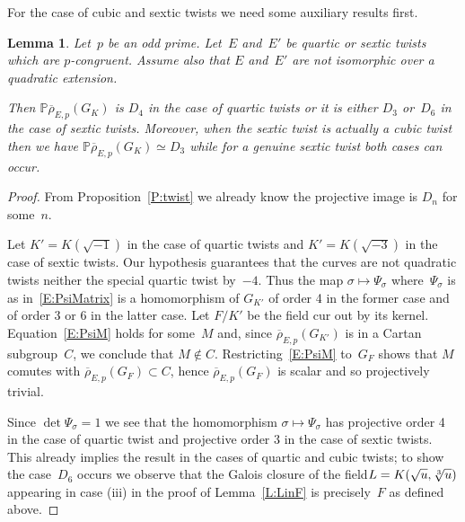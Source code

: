 \documentclass[12pt, reqno]{amsart}
\newcommand{\PP}{\mathbb{P}}
\newcommand{\rhobar}{{\overline{\rho}}}
\numberwithin{equation}{section}
\newtheorem{lemma}[theorem]{Lemma}
\theoremstyle{definition}
\theoremstyle{remark}
\begin{document}
For the case of cubic and sextic twists we need some auxiliary results first. 

\begin{lemma}\label{L:dihedral}
Let~$p$ be an odd prime. Let~$E$ and~$E'$ be quartic or sextic twists which are 
$p$-congruent. Assume also that $E$ and~$E'$
are not isomorphic over a quadratic extension.

Then $\PP\rhobar_{E,p}(G_K)$ is $D_4$ in the case of quartic twists or it is either $D_3$ or~$D_6$ in the case of sextic twists.
Moreover, when the sextic twist is actually a cubic twist then we have $\PP\rhobar_{E,p}(G_K) \simeq D_3$ while for a genuine sextic twist both cases can occur.
\end{lemma}
\begin{proof} From Proposition~\ref{P:twist} we already know the projective image is $D_n$ for some~$n$. 

Let $K'=K(\sqrt{-1})$ in the case of quartic twists and $K'=K(\sqrt{-3})$ in the case of sextic twists. Our hypothesis guarantees that the curves are not quadratic twists neither the special quartic twist by~$-4$. 
Thus the map $\sigma \mapsto \Psi_\sigma$ where~$\Psi_\sigma$ is as in~\eqref{E:PsiMatrix} is a homomorphism of $G_{K'}$ of order 4 in the former case and of order 3 or 6 in the latter case.
Let $F/K'$ be the field cur out by its kernel. Equation~\eqref{E:PsiM} holds for some~$M$ and, since $\rhobar_{E,p}(G_{K'})$ is in a Cartan subgroup~$C$, we conclude that 
$M \not\in C$. Restricting~\eqref{E:PsiM} to~$G_F$ shows that $M$ comutes with $\rhobar_{E,p}(G_F) \subset C$, hence 
$\rhobar_{E,p}(G_F)$ is scalar and so 
projectively trivial.

Since $\det \Psi_\sigma = 1$ we see that the homomorphism $\sigma \mapsto \Psi_\sigma$ has projective order 4 in the case of quartic twist and projective order 3 in the case of sextic twists. This already implies the result in the cases of quartic and cubic twists; to show the case~$D_6$ occurs we observe 
that the Galois closure of the field$L=K(\sqrt{u},\root 3 \of u)$ appearing in 
case (iii) in the proof of Lemma~\ref{L:LinF} is precisely~$F$ as defined above.
\end{proof}
\end{document}
